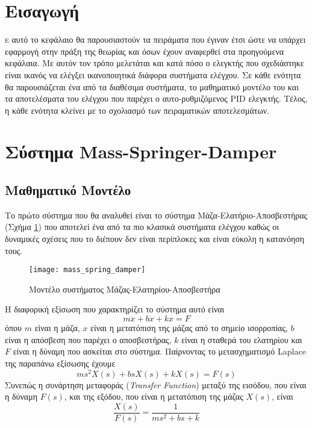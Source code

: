 


\section{Εισαγωγή}

\lettrine[findent=2pt]{}{ε} αυτό το κεφάλαιο θα παρουσιαστούν τα πειράματα που έγιναν έτσι ώστε να υπάρχει εφαρμογή στην πράξη της θεωρίας και όσων έχουν αναφερθεί στα προηγούμενα κεφάλαια. Με αυτόν τον τρόπο μελετάται και κατά πόσο ο ελεγκτής που σχεδιάστηκε είναι ικανός να ελέγξει ικανοποιητικά διάφορα συστήματα ελέγχου. Σε κάθε ενότητα θα παρουσιάζεται ένα από τα διαθέσιμα συστήματα, το μαθηματικό μοντέλο του και τα αποτελέσματα του ελέγχου που παρέχει ο αυτο-ρυθμιζόμενος PID ελεγκτής. Τέλος, η κάθε ενότητα κλείνει με το σχολιασμό των πειραματικών αποτελεσμάτων.

\section{Σύστημα Mass-Springer-Damper}

\subsection{Μαθηματικό Μοντέλο}

Το πρώτο σύστημα που θα αναλυθεί είναι το σύστημα Μάζα-Ελατήριο-Αποσβεστήρας (Σχήμα \ref{fig:mass_spring_damper}) που αποτελεί ένα από τα πιο κλασικά συστήματα ελέγχου καθώς οι δυναμικές σχέσεις που το διέπουν δεν είναι περίπλοκες και είναι εύκολη η κατανόηση τους.

\begin{figure}[h]
  \centering
  \texttt{[image: mass\_spring\_damper]}
  \caption{Μοντέλο συστήματος Μάζας-Ελατηρίου-Αποσβεστήρα}
  \label{fig:mass_spring_damper}
\end{figure}

\noindent
H διαφορική εξίσωση που χαρακτηρίζει το σύστημα αυτό είναι
\begin{equation}
m\ddot{x} + b\dot{x} + kx = F
\label{eq:mass_springer_damper_ode}
\end{equation}
όπου $m$ είναι η μάζα, $x$ είναι η μετατόπιση της μάζας από το σημείο ισορροπίας, $b$ είναι η απόσβεση που παρέχει ο αποσβεστήρας, $k$ είναι η σταθερά του ελατηρίου και $F$ είναι η δύναμη που ασκείται στο σύστημα. Παίρνοντας το μετασχηματισμό Laplace της παραπάνω εξίσωσης έχουμε
\begin{equation}
ms^2X(s) + bsX(s) + kX(s) = F(s)
\label{eq:mass_springer_damper_laplace}
\end{equation}
Συνεπώς η συνάρτηση μεταφοράς (\emph{Transfer Function}) μεταξύ της εισόδου, που είναι η δύναμη $F(s)$, και της εξόδου, που είναι η μετατόπιση της μάζας $X(s)$, είναι
\begin{equation}
\frac{X(s)}{F(s)} = \frac{1}{ms^2 + bs + k}
\end{equation}

